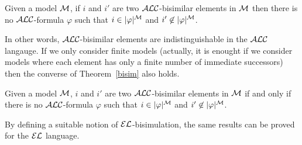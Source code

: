 \begin{theorem}\label{bisim}
Given a model $\mathcal{M}$, if  $i$ and $i'$ are two $\mathcal{ALC}$-bisimilar elements in $\mathcal{M}$
then there is no $\mathcal{ALC}$-formula $\varphi$ such that $i \in |\varphi|^{\mathcal{M}}$ and
$i' \not \in |\varphi|^{\mathcal{M}}$.
\end{theorem}

In other words, $\mathcal{ALC}$-bisimilar elements are indistinguishable in the $\mathcal{ALC}$ langauge.
If we only consider finite models (actually, it is enought if we consider models where each element has only a finite number of immediate successors) then the converse of Theorem~\ref{bisim} also holds.

\begin{theorem}\label{bisim2}
Given a model $\mathcal{M}$, $i$ and $i'$ are two $\mathcal{ALC}$-bisimilar elements in $\mathcal{M}$
if and only if there is no $\mathcal{ALC}$-formula $\varphi$ such that $i \in |\varphi|^{\mathcal{M}}$ and
$i' \not \in |\varphi|^{\mathcal{M}}$.
\end{theorem}

By defining a suitable notion of $\mathcal{EL}$-bisimulation, the same results can be proved for
the $\mathcal{EL}$ language. 

\cite{paig:thre87}

\cite{dovier04:_effic_algor_for_comput_bisim_equiv}

